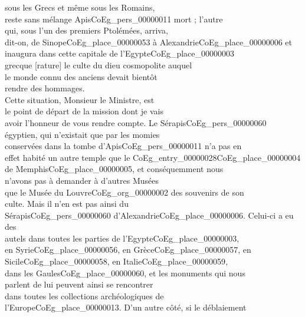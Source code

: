 \documentclass{book}
\begin{document}
{\begin{paracol}{2}
sous les Grecs et même sous les Romains,\\
reste sans mélange Apis\gls{CoEg_pers_00000011} mort ; l’autre\\
qui, sous l’un des premiers Ptolémées, arriva,\\
dit-on, de Sinope\gls{CoEg_place_00000053} à Alexandrie\gls{CoEg_place_00000006} et\\
inaugura dans cette capitale de l’Egypte\gls{CoEg_place_00000003}\\
grecque [rature] le culte du dieu cosmopolite auquel\\
le monde connu des anciens devait bientôt\\
rendre des hommages.\\
\indent Cette situation, Monsieur le Ministre, est\\
le point de départ de la mission dont je vais\\
avoir l’honneur de vous rendre compte. Le Sérapis\gls{CoEg_pers_00000060}\\
égyptien, qui n’existait que par les momies\\
conservées dans la tombe d’Apis\gls{CoEg_pers_00000011} n’a pas en\\
effet habité un autre temple que le \Gls{CoEg_entry_00000028}\gls{CoEg_place_00000004}\\
de Memphis\gls{CoEg_place_00000005}, et conséquemment nous\\
n’avons pas à demander à d’autres Musées\\
que le Musée du Louvre\gls{CoEg_org_00000002} des souvenirs de son\\
culte. Mais il n’en est pas ainsi du\\
Sérapis\gls{CoEg_pers_00000060} d’Alexandrie\gls{CoEg_place_00000006}. Celui-ci a eu des\\
autels dans toutes les parties de l’Egypte\gls{CoEg_place_00000003},\\
en Syrie\gls{CoEg_place_00000056}, en Grèce\gls{CoEg_place_00000057}, en Sicile\gls{CoEg_place_00000058}, en Italie\gls{CoEg_place_00000059},\\
dans les Gaules\gls{CoEg_place_00000060}, et les monuments qui nous\\
parlent de lui peuvent ainsi se rencontrer\\
dans toutes les collections archéologiques de\\
l’Europe\gls{CoEg_place_00000013}. D’un autre côté, si le déblaiement
\end{paracol}

}
\end{document}
